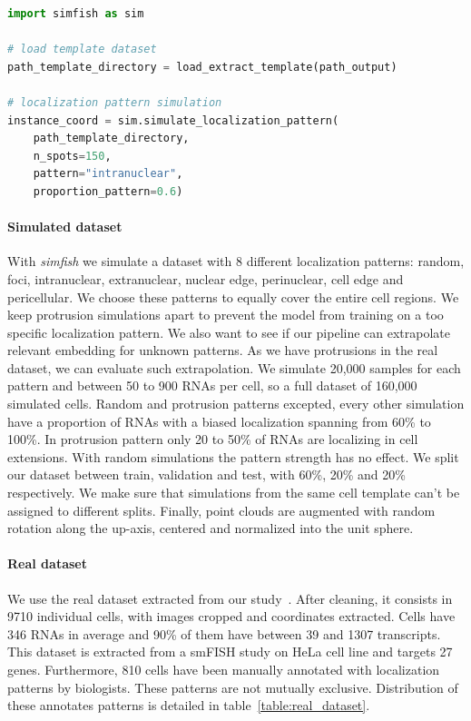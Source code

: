 \begin{minipage}{0.9\textwidth}
\begin{lstlisting}[language=Python]
import simfish as sim

# load template dataset
path_template_directory = load_extract_template(path_output)

# localization pattern simulation
instance_coord = sim.simulate_localization_pattern(
	path_template_directory,
	n_spots=150,
	pattern="intranuclear",
	proportion_pattern=0.6)
\end{lstlisting}
\end{minipage}

\paragraph{Simulated dataset}

With \emph{simfish} we simulate a dataset with 8 different localization patterns: random, foci, intranuclear, extranuclear, nuclear edge, perinuclear, cell edge and pericellular.
We choose these patterns to equally cover the entire cell regions.
We keep protrusion simulations apart to prevent the model from training on a too specific localization pattern.
We also want to see if our pipeline can extrapolate relevant embedding for unknown patterns.
As we have protrusions in the real dataset, we can evaluate such extrapolation.
We simulate 20,000 samples for each pattern and between 50 to 900 \ac{RNA}s per cell, so a full dataset of 160,000 simulated cells.
Random and protrusion patterns excepted, every other simulation have a proportion of \ac{RNA}s with a biased localization spanning from 60\% to 100\%.
In protrusion pattern only 20 to 50\% of \ac{RNA}s are localizing in cell extensions.
With random simulations the pattern strength has no effect.
We split our dataset between train, validation and test, with 60\%, 20\% and 20\% respectively.
We make sure that simulations from the same cell template can't be assigned to different splits.
Finally, point clouds are augmented with random rotation along the up-axis, centered and normalized into the unit sphere.

\paragraph{Real dataset}

We use the real dataset extracted from our study~\cite{CHOUAIB_2020}.
After cleaning, it consists in 9710 individual cells, with images cropped and coordinates extracted.
Cells have 346 \ac{RNA}s in average and 90\% of them have between 39 and 1307 transcripts.
This dataset is extracted from a \ac{smFISH} study on HeLa cell line and targets 27 genes.
Furthermore, 810 cells have been manually annotated with localization patterns by biologists.
These patterns are not mutually exclusive.
Distribution of these annotates patterns is detailed in table~\ref{table:real_dataset}.

